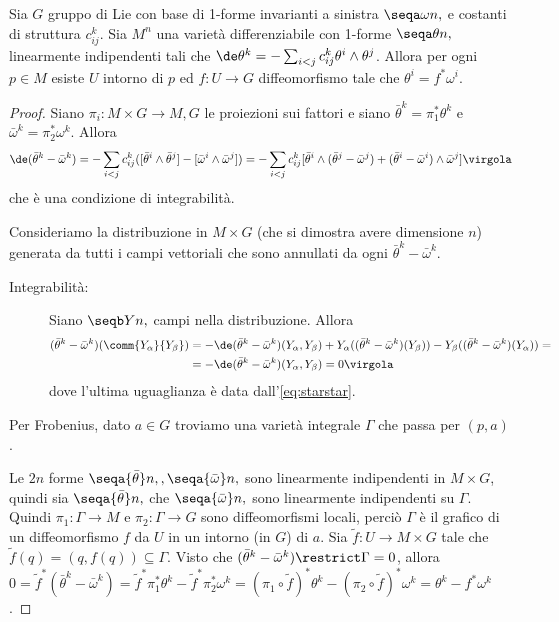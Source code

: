 \begin{theorem}
	Sia $G$ gruppo di Lie con base di 1-forme invarianti a sinistra $\seqa \omega n,$ e costanti di struttura $c_{ij}^k$. Sia $M^n$ una varietà differenziabile con 1-forme $\seqa \theta n,$ linearmente indipendenti tali che $\de \theta^k = - \sum_{i<j} c_{ij}^k \theta^i\wedge \theta^j$.
	Allora per ogni $p\in M$ esiste $U$ intorno di $p$ ed $f: U \to G$ diffeomorfismo tale che $\theta^i = f^*\omega^i$. 
\end{theorem}
\begin{proof}
	Siano $\pi_i : M \times G\to M,G$ le proiezioni sui fattori e siano $\bar\theta^k = \pi_1^*\theta^k$ e $\bar \omega^k = \pi_2^* \omega^k$.
	Allora
	\begin{equation} \label{eq:starstar}
		\de (\bar \theta^k - \bar \omega^k) = -\sum_{i<j} c_{ij}^k ([\bar \theta^i \wedge \bar \theta^j] - [\bar \omega^i \wedge \bar \omega^j]) = - \sum_{i<j} c_{ij}^k [\bar \theta^i \wedge (\bar\theta^j - \bar \omega^j) + (\bar\theta^i - \bar \omega^i)\wedge \bar \omega^j] \virgola
	\end{equation}
	che è una condizione di integrabilità.
	
	Consideriamo la distribuzione in $M\times G$ (che si dimostra avere dimensione $n$) generata da tutti i campi vettoriali che sono annullati da ogni $\bar \theta^k - \bar \omega^k$.
	
	\begin{description}
		\item [Integrabilità:] Siano $\seqb Yn,$ campi nella distribuzione. Allora
		\begin{align*}
			(\bar\theta^k - \bar\omega^k) (\comm{Y_\alpha}{ Y_\beta}) &= -\de (\bar\theta^k - \bar\omega^k)(Y_\alpha, Y_\beta) + Y_\alpha((\bar\theta^k - \bar\omega^k)(Y_\beta)) - Y_\beta ((\bar\theta^k - \bar\omega^k) ( Y_\alpha)) =\\
			&= - \de (\bar\theta^k - \bar\omega^k) (Y_\alpha,Y_\beta) = 0\virgola
		\end{align*}
		dove l'ultima uguaglianza è data dall'\cref{eq:starstar}.
	\end{description}

	Per Frobenius, dato $a \in G$ troviamo una varietà integrale $\Gamma$ che passa per $(p,a)$.
	
	Le $2n$ forme $\seqa {\bar \theta}n, , \seqa {\bar\omega}n,$ sono linearmente indipendenti in $M\times G$, quindi sia $\seqa{\bar\theta}n,$ che $\seqa {\bar\omega}n,$ sono linearmente indipendenti su $\Gamma$.
	Quindi $\pi_1: \Gamma \to M$ e $\pi_2: \Gamma \to G$ sono diffeomorfismi locali, perciò $\Gamma$ è il grafico di un diffeomorfismo $f$ da $U$ in un intorno (in $G$) di $a$.
	Sia $\tilde f: U \to M\times G$ tale che $\tilde f(q) = (q,f(q)) \subseteq \Gamma$.
	Visto che $(\bar\theta^k - \bar\omega^k)\restrict \Gamma = 0$, allora $0 = \tilde f^*(\bar\theta^k - \bar\omega^k) = \tilde f^* \pi_1^*\theta^k - \tilde f^* \pi_2^*\omega^k = (\pi_1\circ \tilde f)^* \theta^k - (\pi_2 \circ \tilde f)^* \omega^k = \theta^k - f^* \omega^k$.
\end{proof}


